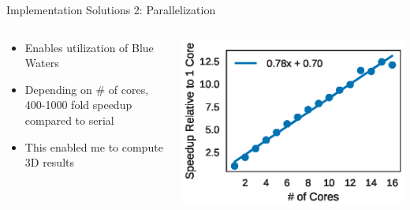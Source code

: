 \documentclass[10pt]{beamer}
\begin{document}
{{{{{{{{{{{\begin{frame}{Implementation Solutions 2: Parallelization}
	\begin{columns}[c] %
		\begin{column}{.4\textwidth}
			\begin{itemize}
			  \item {Enables utilization of Blue Waters}
			  \item {Depending on \# of cores, 400-1000 fold speedup compared to serial}			  			  
			  \item {This enabled me to compute 3D results}
			\end{itemize}
		\end{column}
		\begin{column}{0.7\textwidth}
		    \vspace{5mm}
		    \begin{overprint}
		    \centering
			    \includegraphics[width=0.9\linewidth]{../figures/parallel-scaling.eps}
			\end{overprint}
		\end{column}
	\end{columns}
\end{frame}

}}}}}}}}}}}
\end{document}
